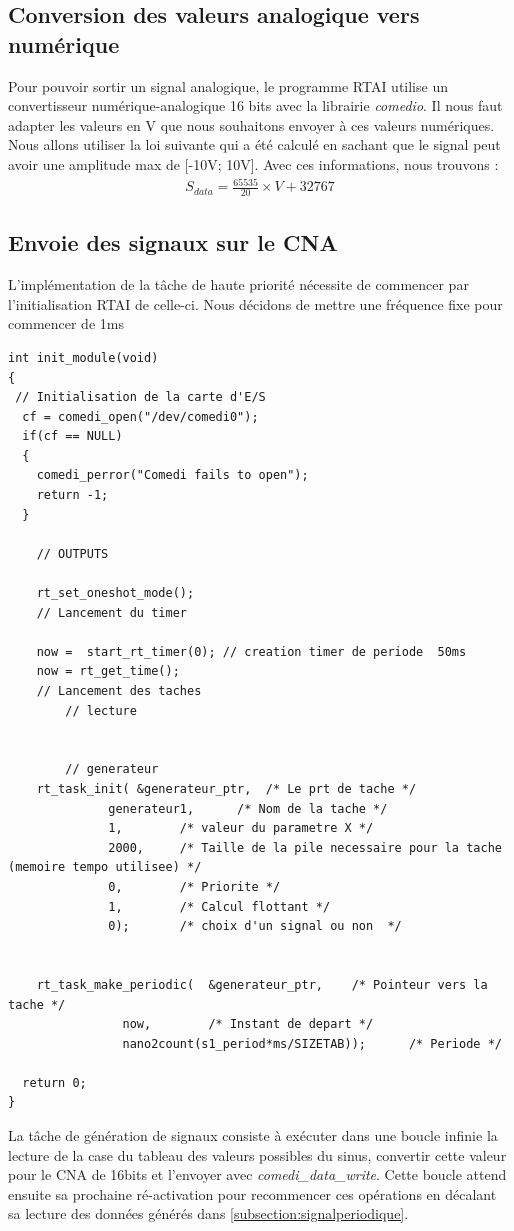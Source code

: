 \subsection{Conversion des valeurs analogique vers numérique}
Pour pouvoir sortir un signal analogique, le programme RTAI utilise un convertisseur numérique-analogique 16 bits avec la librairie \emph{comedio}. Il nous faut adapter les valeurs en V que nous souhaitons envoyer à ces valeurs numériques. Nous allons utiliser la loi suivante qui a été calculé en sachant que le signal peut avoir une amplitude max de [-10V; 10V]. Avec ces informations, nous trouvons : \begin{align*}
S_{data} = \frac{65535}{20}\times V + 32767
\end{align*}

\subsection{Envoie des signaux sur le CNA}
L'implémentation de la tâche de haute priorité nécessite de commencer par l'initialisation RTAI de celle-ci. Nous décidons de mettre une fréquence fixe pour commencer de 1ms  
\begin{lstlisting}[style = customc]
int init_module(void)
{	 
 // Initialisation de la carte d'E/S
  cf = comedi_open("/dev/comedi0");	
  if(cf == NULL)
  {
    comedi_perror("Comedi fails to open");
    return -1;
  }

   	// OUTPUTS

	rt_set_oneshot_mode();
	// Lancement du timer

	now =  start_rt_timer(0); // creation timer de periode  50ms
 	now = rt_get_time();
  	// Lancement des taches
  		// lecture 
	 
			
  		// generateur  
 	rt_task_init( &generateur_ptr, 	/* Le prt de tache */
	 	      generateur1,	   	/* Nom de la tache */
	 	      1, 		/* valeur du parametre X */
	 	      2000,		/* Taille de la pile necessaire pour la tache (memoire tempo utilisee) */
	 	      0,		/* Priorite */
	 	      1,  		/* Calcul flottant */
	 	      0); 		/* choix d'un signal ou non  */
	 	      

	rt_task_make_periodic(	&generateur_ptr, 	/* Pointeur vers la tache */
				now,		/* Instant de depart */
				nano2count(s1_period*ms/SIZETAB));		/* Periode */

  return 0;
}
\end{lstlisting}
La tâche de génération de signaux consiste à exécuter dans une boucle infinie la lecture de la case du tableau des valeurs possibles du sinus, convertir cette valeur pour le CNA de 16bits et l'envoyer avec \emph{comedi\_data\_write}. Cette boucle attend ensuite sa prochaine ré-activation pour recommencer ces opérations en décalant sa lecture des données générés dans \ref{subsection:signalperiodique}.
